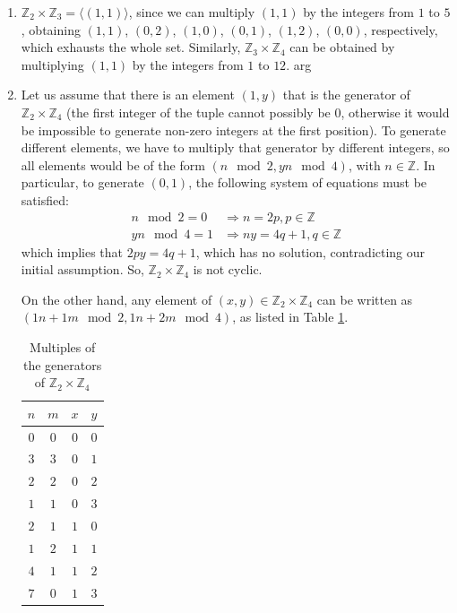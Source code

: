 \documentclass{article}
\newcommand{\angled}[1]{\langle#1\rangle}
\begin{document}
\begin{enumerate}
    \item $\mathbb{Z}_2 \times \mathbb{Z}_3 = \angled{(1, 1)}$, since we can multiply $(1, 1)$ by the integers from $1$ to $5$, obtaining $(1, 1)$, $(0, 2)$, $(1, 0)$, $(0, 1)$, $(1, 2)$, $(0, 0)$, respectively, which exhausts the whole set. Similarly, $\mathbb{Z}_3 \times \mathbb{Z}_4$ can be obtained by multiplying $(1, 1)$ by the integers from $1$ to $12$.
    arg
    \item Let us assume that there is an element $(1, y)$ that is the generator of $\mathbb{Z}_2 \times \mathbb{Z}_4$ (the first integer of the tuple cannot possibly be 0, otherwise it would be impossible to generate non-zero integers at the first position). To generate different elements, we have to multiply that generator by different integers, so all elements would be of the form $(n\mod 2, yn \mod 4)$, with $n \in \mathbb{Z}$. In particular, to generate $(0, 1)$, the following system of equations must be satisfied:
    \begin{equation*}
        \begin{split}
            n \mod 2 = 0 & \Rightarrow n = 2p, p \in \mathbb{Z}\\
            yn \mod 4 = 1 & \Rightarrow ny = 4q + 1, q \in \mathbb{Z}              
        \end{split}
    \end{equation*}
    which implies that $2py = 4q + 1$, which has no solution, contradicting our initial assumption. So, $\mathbb{Z}_2 \times \mathbb{Z}_4$ is not cyclic.

    On the other hand, any element of $(x, y) \in \mathbb{Z}_2 \times \mathbb{Z}_4$ can be written as $(1n + 1m \mod 2, 1n + 2m \mod 4)$, as listed in Table \ref{tab:multiples-gen-z2z4}.

    \begin{table}[!hb]
        \centering
        \begin{tabular}{cc|cc}
        $n$ & $m$ & $x$ & $y$ \\ \hline
        $0$   & $0$   & $0$   & $0$   \\
        $3$   & $3$   & $0$   & $1$   \\
        $2$   & $2$   & $0$   & $2$   \\
        $1$   & $1$   & $0$   & $3$   \\
        $2$   & $1$   & $1$   & $0$   \\
        $1$   & $2$   & $1$   & $1$   \\
        $4$   & $1$   & $1$   & $2$   \\
        $7$   & $0$   & $1$   & $3$  
        \end{tabular}
        \caption{Multiples of the generators of $\mathbb{Z}_2 \times \mathbb{Z}_4$}
        \label{tab:multiples-gen-z2z4}
        \end{table}


\end{enumerate}
\end{document}
